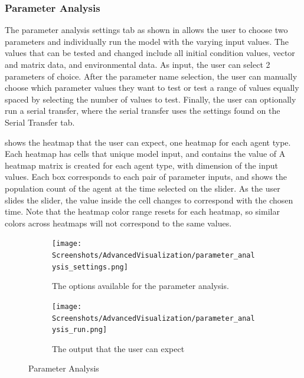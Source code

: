 \subsubsection{Parameter Analysis}
The parameter analysis settings tab as shown in  allows the user to choose two parameters and individually run the model with the varying input values.
The values that can be tested and changed include all initial condition values, vector and matrix data, and environmental data.
As input, the user can select 2 parameters of choice.
After the parameter name selection, the user can manually choose which parameter values they want to test or test a range of values equally spaced by selecting the number of values to test.
Finally, the user can optionally run a serial transfer, where the serial transfer uses the settings found on the Serial Transfer tab. \newline

 shows the heatmap that the user can expect, one heatmap for each agent type.
Each heatmap has cells that unique model input, and contains the value of
A heatmap matrix is created for each agent type, with dimension of the input values.
Each box corresponds to each pair of parameter inputs, and shows the population count of the agent at the time selected on the slider. 
As the user slides the slider, the value inside the cell changes to correspond with the chosen time. 
Note that the heatmap color range resets for each heatmap, so similar colors across heatmaps will not correspond to the same values.

\begin{figure}[h!]
    \centering
    \begin{subfigure}{0.49\linewidth}
        \centering
        \vspace*{\fill}
        \texttt{[image: Screenshots/AdvancedVisualization/parameter\_analysis\_settings.png]}
        \caption{
            The options available for the parameter analysis. 
        }
        \label{fig:ss:av:parameter_analysis_settings}
        \vspace*{\fill}
    \end{subfigure}
    \hfill
    \begin{subfigure}{0.49\linewidth}
        \centering
        \vspace*{\fill}
        \texttt{[image: Screenshots/AdvancedVisualization/parameter\_analysis\_run.png]}
        \caption{
            The output that the user can expect
        }
        \label{fig:ss:av:parameter_analysis_run}
        \vspace*{\fill}
    \end{subfigure}
    \caption{Parameter Analysis}
\end{figure}


